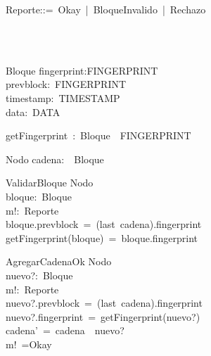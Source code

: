 \begin{zed}
Reporte::=~Okay~|~BloqueInvalido~|~Rechazo~\\
\\
\end{zed}
\begin{zed}
\\
\end{zed}
\begin{schema}{Bloque}
fingerprint:FINGERPRINT\\
prevblock:~FINGERPRINT\\
timestamp:~TIMESTAMP\\
data:~DATA\\
\end{schema}
\begin{axdef}
getFingerprint~:~Bloque~\fun~FINGERPRINT\\
\end{axdef}
\begin{schema}{Nodo}
cadena:~\seq~Bloque\\
\end{schema}
\begin{schema}{ValidarBloque}
\Xi Nodo\\
bloque:~Bloque\\
m!:~Reporte\\
\where
bloque.prevblock~=~(last~cadena).fingerprint\\
getFingerprint(bloque)~=~bloque.fingerprint\\
\end{schema}
\begin{schema}{AgregarCadenaOk}
\Delta Nodo\\
nuevo?:~Bloque\\
m!:~Reporte\\
\where
nuevo?.prevblock~=~(last~cadena).fingerprint\\
nuevo?.fingerprint~=~getFingerprint(nuevo?)\\
cadena'~=~cadena~\cat~\langle nuevo?\rangle\\
m!~=Okay\\
\end{schema}
